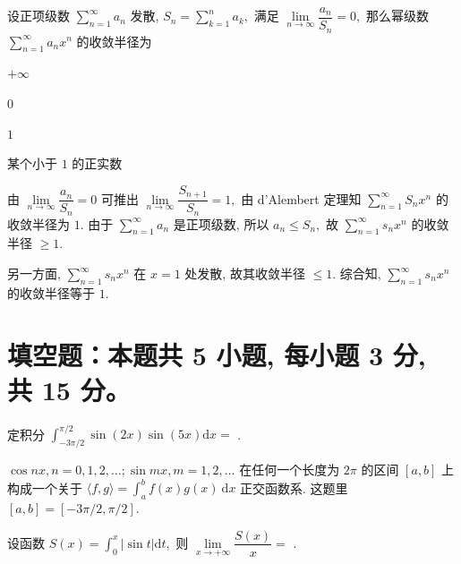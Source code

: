 \begin{question}
设正项级数 $\sum\limits_{n=1}^{\infty} a_n$ 发散, $S_n = \sum\limits_{k=1}^{n} a_k,$ 满足 $\lim\limits_{n\to\infty} \dfrac{a_n}{S_n} = 0,$ 那么幂级数 $\sum\limits_{n=1}^{\infty} a_n x^n$ 的收敛半径为 \paren[C]

\begin{choices}
\item $+\infty$
\item $0$
\item $1$
\item 某个小于 $1$ 的正实数
\end{choices}
\end{question}

\begin{solution}
由 $\lim\limits_{n\to\infty} \dfrac{a_n}{S_n} = 0$ 可推出 $\lim\limits_{n\to\infty} \dfrac{S_{n+1}}{S_n} = 1,$ 由 d'Alembert 定理知 $\sum\limits_{n=1}^{\infty} S_n x^n$ 的收敛半径为 $1.$ 由于 $\sum\limits_{n=1}^{\infty} a_n$ 是正项级数, 所以 $a_n \leqslant S_n,$ 故 $\sum\limits_{n=1}^{\infty} s_n x^n$ 的收敛半径 $\geqslant 1.$

另一方面, $\sum\limits_{n=1}^{\infty} s_n x^n$ 在 $x = 1$ 处发散, 故其收敛半径 $\leqslant 1.$ 综合知, $\sum\limits_{n=1}^{\infty} s_n x^n$ 的收敛半径等于 $1.$
\end{solution}


\section{填空题：本题共 5 小题, 每小题 3 分, 共 15 分。}



\begin{question}
定积分 $\int_{-3\pi/2}^{\pi/2} \sin(2x) \sin(5x) \mathrm{d} x = $ \fillin[0].
\end{question}

\begin{solution}
$\cos nx, n = 0, 1, 2, \dots; \sin m x, m = 1, 2, \dots$ 在任何一个长度为 $2\pi$ 的区间 $[a,b]$ 上构成一个关于 $\langle f, g \rangle = \int_{a}^{b} f(x)g (x) ~ \mathrm{d} x$ 正交函数系. 这题里 $[a, b] = [-3\pi/2, \pi/2].$
\end{solution}

\begin{question}
设函数 $S(x) = \int_0^x \lvert \sin t \rvert \mathrm{d} t,$ 则 $\lim\limits_{x\to+\infty} \dfrac{S(x)}{x} =$ \fillin[$\dfrac{2}{\pi}$].
\end{question}

